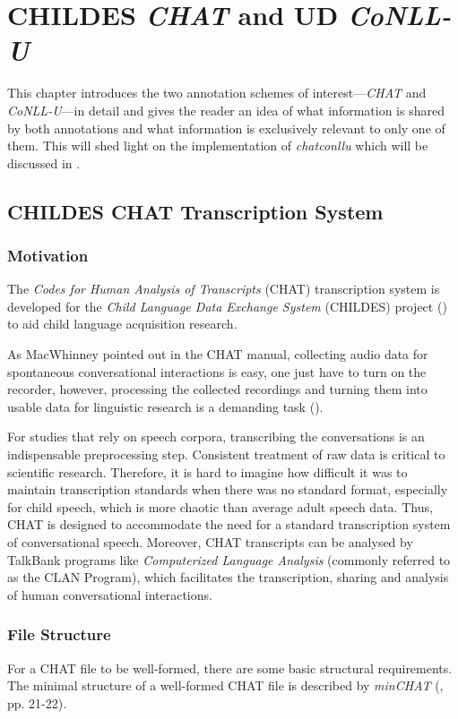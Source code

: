 \chapter{CHILDES \emph{CHAT} and UD \emph{CoNLL-U}}
\label{Chapter2}

This chapter introduces the two annotation schemes of interest---\emph{CHAT} and \emph{CoNLL-U}---in detail and gives the reader an idea of what information is shared by both annotations and what information is exclusively relevant to only one of them. This will shed light on the implementation of \emph{chatconllu} which will be discussed in .

\section{CHILDES CHAT Transcription System}

\subsection{Motivation}
The \emph{Codes for Human Analysis of Transcripts} (CHAT) transcription system is developed for the \emph{Child Language Data Exchange System} (CHILDES) project (\cite{Macwhinney2000}) to aid child language acquisition research.

As MacWhinney pointed out in the CHAT manual, collecting audio data for spontaneous conversational interactions is easy, one just have to turn on the recorder, however, processing the collected recordings and turning them into usable data for linguistic research is a demanding task (\cite{Macwhinney2000}).

For studies that rely on speech corpora, transcribing the conversations is an indispensable preprocessing step. Consistent treatment of raw data is critical to scientific research. Therefore, it is hard to imagine how difficult it was to maintain transcription standards when there was no standard format, especially for child speech, which is more chaotic than average adult speech data. Thus, CHAT is designed to accommodate the need for a standard transcription system of conversational speech. Moreover, CHAT transcripts can be analysed by TalkBank programs like \emph{Computerized Language Analysis} (commonly referred to as the CLAN Program), which facilitates the transcription, sharing and analysis of human conversational interactions.

\subsection{File Structure}
For a CHAT file to be well-formed, there are some basic structural requirements. The minimal structure of a well-formed CHAT file is described by \emph{minCHAT} (\cite{Macwhinney2000}, pp. 21-22).

